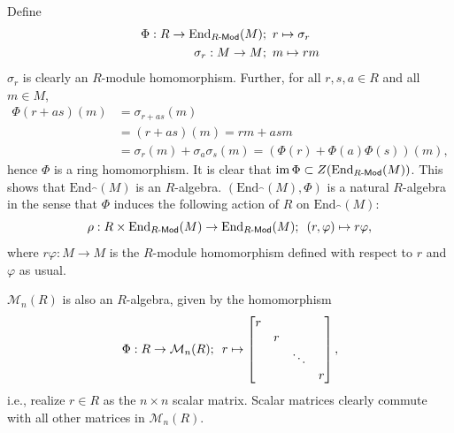 \documentclass[12pt]{article}
\begin{document}
\subsection{} 
Define 
\begin{align*}
  \Phi:R \rightarrow \text{End}_{R\textsf{-Mod}}(M); \hspace{0.5em} & r \mapsto \sigma_r \\ 
  \sigma_{r}:M \rightarrow M; \hspace{0.5em} & m \mapsto rm
\end{align*}
$\sigma_{r}$ is clearly an $R$-module homomorphism. 
Further, for all $r, s, a \in R$ and all $m \in M$,  
\begin{align*}
  \Phi(r + as)(m) & = \sigma_{r + as}(m) \\ 
                  & =  (r + as)(m) = rm + asm \\ 
               & = \sigma_{r}(m) + \sigma_{a}\sigma_{s}(m) = (\Phi(r) + \Phi(a)\Phi(s))(m),
\end{align*}
hence $\Phi$ is a ring homomorphism. 
It is clear that $\operatorname{im} \Phi \subset Z(\text{End}_{R\textsf{-Mod}}(M))$. 
This shows that $\text{End}_{\cat}(M)$ is an $R$-algebra. 
$(\text{End}_{\cat}(M), \Phi)$ is a natural $R$-algebra in the sense that $\Phi$ induces the following action of $R$ on $\text{End}_{\cat}(M)$:
$$\rho: R \times \text{End}_{R\textsf{-Mod}}(M) \rightarrow \text{End}_{R\textsf{-Mod}}(M); \hspace{0.5em} (r, \varphi) \mapsto r\varphi,$$
where $r \varphi:M \rightarrow M$ is the $R$-module homomorphism defined with respect to $r$ and $\varphi$ as usual. 

$\mathcal{M}_{n}(R)$ is also an $R$-algebra, given by the homomorphism 
$$\Phi: R \rightarrow \mathcal{M}_{n}(R); \hspace{0.5em} r \mapsto \begin{bmatrix}r \\ & r \\ & & \ddots \\ & & & r\end{bmatrix},$$
i.e., realize $r \in R$ as the $n \times n$ scalar matrix. 
Scalar matrices clearly commute with all other matrices in $\mathcal{M}_{n}(R)$. 

\setcounter{subsection}{10} 
\end{document}
